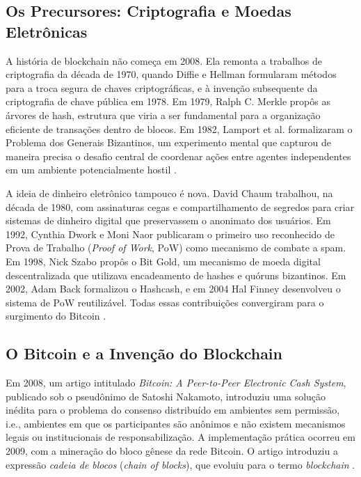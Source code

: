 \documentclass[12pt,a4paper]{report}
\begin{document}
\subsection{Os Precursores: Criptografia e Moedas Eletrônicas}

A história de blockchain não começa em 2008. Ela remonta a trabalhos de criptografia da década de 1970, quando Diffie e Hellman formularam métodos para a troca segura de chaves criptográficas, e à invenção subsequente da criptografia de chave pública em 1978. Em 1979, Ralph C. Merkle propôs as árvores de hash, estrutura que viria a ser fundamental para a organização eficiente de transações dentro de blocos. Em 1982, Lamport et al. formalizaram o Problema dos Generais Bizantinos, um experimento mental que capturou de maneira precisa o desafio central de coordenar ações entre agentes independentes em um ambiente potencialmente hostil \cite{Bashir2023}.

A ideia de dinheiro eletrônico tampouco é nova. David Chaum trabalhou, na década de 1980, com assinaturas cegas e compartilhamento de segredos para criar sistemas de dinheiro digital que preservassem o anonimato dos usuários. Em 1992, Cynthia Dwork e Moni Naor publicaram o primeiro uso reconhecido de Prova de Trabalho (\textit{Proof of Work}, PoW) como mecanismo de combate a spam. Em 1998, Nick Szabo propôs o Bit Gold, um mecanismo de moeda digital descentralizada que utilizava encadeamento de hashes e quóruns bizantinos. Em 2002, Adam Back formalizou o Hashcash, e em 2004 Hal Finney desenvolveu o sistema de PoW reutilizável. Todas essas contribuições convergiram para o surgimento do Bitcoin \cite{Bashir2023}.

\subsection{O Bitcoin e a Invenção do Blockchain}

Em 2008, um artigo intitulado \textit{Bitcoin: A Peer-to-Peer Electronic Cash System}, publicado sob o pseudônimo de Satoshi Nakamoto, introduziu uma solução inédita para o problema do consenso distribuído em ambientes sem permissão, i.e., ambientes em que os participantes são anônimos e não existem mecanismos legais ou institucionais de responsabilização. A implementação prática ocorreu em 2009, com a mineração do bloco gênese da rede Bitcoin. O artigo introduziu a expressão \textit{cadeia de blocos} (\textit{chain of blocks}), que evoluiu para o termo \textit{blockchain} \cite{Bashir2023}.
\end{document}

